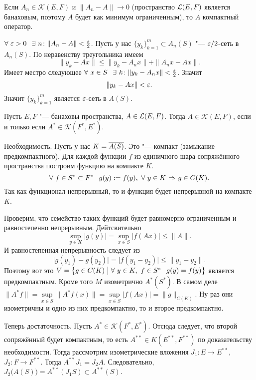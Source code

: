 \begin{Lem}
  Если $A_n\in \mathcal K(E,F)$ и $\|A_n-A\|\to 0$ (пространство $\mathcal L(E,F)$ является банаховым, поэтому $A$ будет как минимум ограниченным), то $A$ компактный оператор.
\end{Lem}
\begin{Proof}
 $\forall\ \e>0\pau \exists\ n\colon \|A_n-A\|<\frac\e2$.
 Пусть у нас $\{y_k\}_{k=1}^m\subset A_n(S)$ "--- $\varepsilon/2$-сеть в $A_n(S)$.
По неравенству треугольника имеем
\[
  \|y_k-Ax\|\le \|y_k-A_nx\| + \|A_nx - Ax\|.
\]
Имеет местро следующее $\forall\ x\in S\pau \exists\ k\colon \|y_k - A_n x\|<\frac\e2$. Значит
\[
  \|y_k-Ax\|<\varepsilon.
\]
Значит $\{y_k\}_{k=1}^m$ является $\varepsilon$-сеть в $A(S)$.
\end{Proof}
\begin{The}[Шаудера]
  Пусть $E,F$ "--- банаховы пространства, $A\in\mathcal L(E,F)$. Тогда $A\in\mathcal K(E,F)$, если и только если $A^*\in\mathcal K(F^*,E^*)$.
\end{The}
\begin{Proof}
 Необходимость.  Пусть у нас $K = \overline{A(S)}$. Это "--- компакт (замыкание предкомпактного). Для каждой функции $f$ из единичного шара сопряжённого пространства построим функцию на компакте $K$.
\[
  \forall\ f\in S^*\subset F^*\pau
  g(y) := f(y),\ \forall\ y\in K\imp g\in C(K).
\]
Так как функционал непрерывный, то и функция будет непрерывной на компакте $K$.

Проверим, что семейство таких функций будет равномерно ограниченным и равностепенно непрерывным. Дейтсвительно
\[
  \sup\limits_{y\in K} \big|g(y)\big| = \sup\limits_{x\in S} \big|f(Ax)\big|\le \|A\|.
\]
И равностепенная непрерывность следует из
\[
  \big|g(y_1)-g(y_2)\big| = \big|f(y_1-y_2)\big|\le \|y_1-y_2\|.
\]
Поэтому вот это $V = \big\{g\in C(K)\bigm| \forall\ y\in K,\ f\in S^*\hskip .75em plus.1em minus.08em\relax g(y) = f(y)\big\}$ является предкомпактным. Кроме того $M$ изометрично $A^*(S^*)$.
В самом деле $\|A^*f\| = \sup\limits_{x\in S}\big\|A^* f(x)\big\| = \sup\limits_{x\in S} \big|f(Ax)\big| = \|g\|_{C(K)}$. Ну раз они изометричны и одно из них предкомпактно, то и второе предкомпактно.

Теперь достаточность.
Пусть $A^*\in\mathcal K(F^*,E^*)$. Отсюда следует, что второй сопряжённый будет компактным, то есть $A^{**}\in K(E^{**},F^{**})$ по доказательству необходимости. 
Тогда рассмотрим изометрические вложения  
$J_1\colon E \to E^{**}$, $J_2\colon F\to F^{**}$. Тогда $A^{**} J_1 = J_2A$. Следовательно, $J_2\big(A(S)\big) = A^{**}(J_1S)\subset A^{**}(S)$.
\end{Proof}

